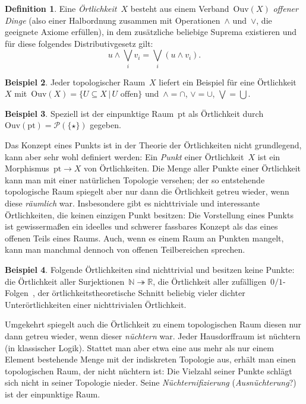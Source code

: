 \documentclass[a4paper,ngerman,12pt]{scrartcl}
\theoremstyle{definition}
\newtheorem{defn}{Definition}[section]
\newtheorem{bsp}[defn]{Beispiel}
\theoremstyle{plain}
\theoremstyle{remark}
\newcommand{\RR}{\mathbb{R}}
\newcommand{\NN}{\mathbb{N}}
\renewcommand{\P}{\mathcal{P}}
\newcommand{\Ouv}{\mathrm{Ouv}}
\newcommand{\pt}{\mathrm{pt}}
\renewcommand{\_}{\mathpunct{.}\,}
\newcommand{\?}{\,{:}\,}
\begin{document}
\begin{defn}Eine \emph{Örtlichkeit}~$X$ besteht aus einem Verband~$\Ouv(X)$
\emph{offener Dinge} (also einer Halbordnung zusammen mit Operationen~$\wedge$
und~$\vee$, die geeignete Axiome erfüllen), in dem zusätzliche beliebige
Suprema existieren und für diese folgendes Distributivgesetz gilt:
\[ u \wedge \bigvee_i v_i = \bigvee_i (u \wedge v_i). \]
\end{defn}

\begin{bsp}
Jeder topologischer Raum~$X$ liefert ein Beispiel für eine Örtlichkeit~$X$
mit~$\Ouv(X) = \{ U \subseteq X \,|\, \text{$U$ offen} \}$ und~$\wedge =
\cap$, $\vee = \cup$, $\bigvee = \bigcup$.\end{bsp}

\begin{bsp}Speziell ist der einpunktige Raum~$\pt$ als Örtlichkeit
durch~$\Ouv(\pt) = \P(\{\star\})$ gegeben.\end{bsp}

Das Konzept eines Punkts ist in der Theorie der Örtlichkeiten nicht
grundlegend, kann aber sehr wohl definiert werden: Ein \emph{Punkt} einer
Örtlichkeit~$X$ ist ein Morphismus~$\pt \to X$ von Örtlichkeiten. Die Menge
aller Punkte einer Örtlichkeit kann man mit einer natürlichen Topologie
versehen; der so entstehende topologische Raum spiegelt aber nur dann die
Örtlichkeit getreu wieder, wenn diese \emph{räumlich} war. Insbesondere gibt es
nichttriviale und interessante Örtlichkeiten, die keinen einzigen Punkt
besitzen: Die Vorstellung eines Punkts ist gewissermaßen ein ideelles und
schwerer fassbares Konzept als das eines offenen Teils eines Raums. Auch, wenn
es einem Raum an Punkten mangelt, kann man manchmal dennoch von offenen
Teilbereichen sprechen.

\begin{bsp}Folgende Örtlichkeiten sind nichttrivial und besitzen keine Punkte:
die Örtlichkeit aller Surjektionen~$\NN \twoheadrightarrow \RR$, die
Örtlichkeit aller zufälligen~$0/1$-Folgen~\cite{simpson:random1,simpson:random2}, der örtlichkeitstheoretische Schnitt
beliebig vieler dichter Unterörtlichkeiten einer nichttrivialen Örtlichkeit.\end{bsp}

Umgekehrt spiegelt auch die Örtlichkeit zu einem topologischen Raum diesen nur
dann getreu wieder, wenn dieser \emph{nüchtern} war. Jeder Hausdorffraum ist
nüchtern (in klassischer Logik).
Stattet man aber etwa eine aus mehr als nur einem Element bestehende Menge 
mit der indiskreten Topologie aus, erhält man einen
topologischen Raum, der nicht nüchtern ist: Die Vielzahl seiner Punkte schlägt
sich nicht in seiner Topologie nieder. Seine \emph{Nüchternifizierung}
(\emph{Ausnüchterung}?) ist der einpunktige Raum.
\end{document}
